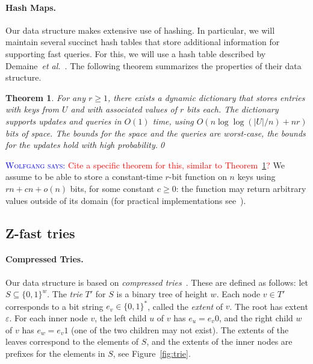 \documentclass[a4paper,11pt]{article}
\newtheorem{theorem} {Theorem}[section]
\newcommand{\eps}{\varepsilon}
\newcommand{\etal}{\emph{et al.}\xspace}
\newcommand{\?}{\mskip1.5mu}
\newcommand{\aremark}[3]{\textcolor{blue}{\textsc{#1 #2:}}
  \textcolor{red}{\textsf{#3}}}
\newcommand{\wolfgang}[2][says]{\aremark{Wolfgang}{#1}{#2}}
\begin{document}
\paragraph{Hash Maps.}
Our data structure makes extensive use of
hashing. In particular, we will maintain several
succinct hash tables that store additional
information for supporting fast queries.
For this, we will use a hash table described
by Demaine~\etal~\cite{DemaineMePaPa06}.
The following theorem summarizes the properties
of their data structure.

\begin{theorem}\label{thm:succinct_retrieval_only_hashtable}
For any $r \geq 1$, there exists a dynamic dictionary that
stores entries with keys from $U$ and with associated
values of $r$ bits each.
The dictionary supports updates and queries in $O(1)$ time,
using $O(n \log\log (|U|/n) + nr)$ \emph{bits} of space.
The bounds for the space and the queries are
worst-case, the bounds for the updates hold with
high probability.\qed
\end{theorem}


\wolfgang{Cite a specific theorem for this, similar to 
  Theorem~\ref{thm:succinct_retrieval_only_hashtable}?}
We assume to be able to store a constant-time $r$-bit function on 
$n$ keys using $rn+cn +o(n)$ bits, for some constant $c\geq 0$: the 
function may return arbitrary values outside of its domain (for 
practical implementations see~\cite{BelazzouguiBoPaVi11}).



\subsection{Z-fast tries} 

\paragraph{Compressed Tries.}
Our data structure is based on \emph{compressed
tries}~\cite{CormenLeRiSt09,Knuth98}. These are defined as
follows: let $S \subseteq \{0, 1\}^w$. The \emph{trie} $T'$ for $S$ 
is a binary tree of height $w$. Each node $v \in T'$ corresponds
to a bit string $e_v \in \{0,1\}^*$, called the \emph{extent} of $v$. 
The root has extent $\eps$. For each inner node $v$, the left child 
$u$ of $v$  has $e_u = e_v0$, and the right child $w$ of $v$ has 
$e_w = e_v1$ (one of the two children may not exist). The extents of
the leaves correspond to the elements of $S$, and the extents of the 
inner nodes are prefixes for the elements in $S$, see Figure~\ref{fig:trie}.
\end{document}
